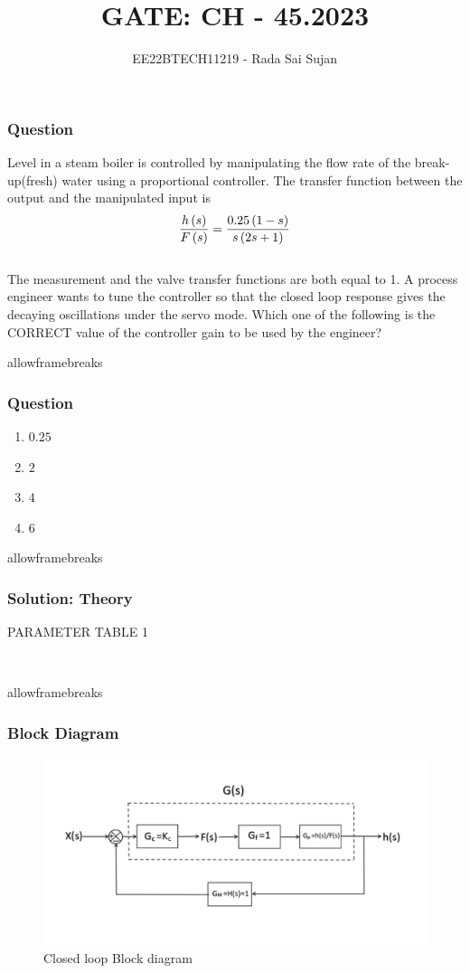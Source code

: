 \documentclass{beamer}
\begin{document}
\title{GATE: CH - 45.2023}
\author{EE22BTECH11219 - Rada Sai Sujan$^{}$%
}
\frame{\titlepage}

\begin{frame}
\frametitle{Question}
Level  in a steam boiler is controlled by manipulating the flow rate  of the break-up(fresh) water using a proportional  controller. The transfer function between the output and the manipulated input is   \\
$$ \frac{h\left(s\right)}{F\left(s\right)}=\frac{0.25\left(1-s\right)}{s\left(2s+1\right)} $$   \\
The measurement and the valve transfer functions are both equal to 1. A process engineer wants to tune the controller so that the closed loop response gives the decaying oscillations under the servo mode. Which one of the following is the CORRECT value of the controller gain to be used by the engineer? \\
\end{frame}

\begin{frame}{allowframebreaks}
\frametitle{Question}
\begin{enumerate}[label=(\alph*)]
    \item $0.25$
    \item $2$
    \item $4$
    \item $6$
\end{enumerate}
\end{frame}

\begin{frame}{allowframebreaks}
\frametitle{Solution: Theory}
\begin{table}[ht]
    \centering
    
    \caption{PARAMETER TABLE 1}
    \label{tab:ch.45.1}
\end{table} \\
\end{frame}

\begin{frame}{allowframebreaks}
\frametitle{Block Diagram}
\begin{figure}[ht]
    \centering
    \includegraphics[width=\columnwidth]{figs/k.png}
    \caption{Closed loop Block diagram}
    \label{fig:ch.45.1}
\end{figure}   
\end{frame}
\end{document}
